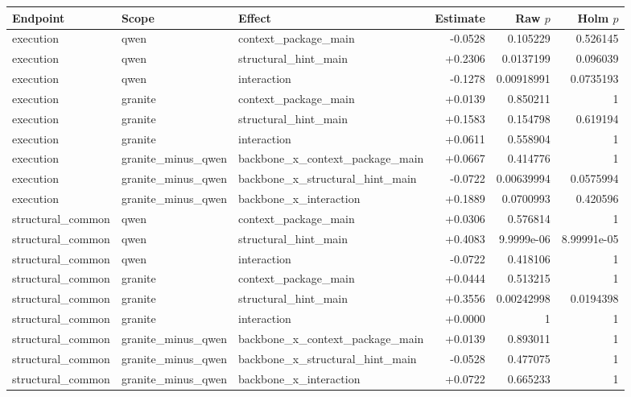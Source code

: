 \begin{tabular}{lllrrr}
\toprule
Endpoint & Scope & Effect & Estimate & Raw $p$ & Holm $p$ \\
\midrule
execution & qwen & context\_package\_main & -0.0528 & 0.105229 & 0.526145 \\
execution & qwen & structural\_hint\_main & +0.2306 & 0.0137199 & 0.096039 \\
execution & qwen & interaction & -0.1278 & 0.00918991 & 0.0735193 \\
execution & granite & context\_package\_main & +0.0139 & 0.850211 & 1 \\
execution & granite & structural\_hint\_main & +0.1583 & 0.154798 & 0.619194 \\
execution & granite & interaction & +0.0611 & 0.558904 & 1 \\
execution & granite\_minus\_qwen & backbone\_x\_context\_package\_main & +0.0667 & 0.414776 & 1 \\
execution & granite\_minus\_qwen & backbone\_x\_structural\_hint\_main & -0.0722 & 0.00639994 & 0.0575994 \\
execution & granite\_minus\_qwen & backbone\_x\_interaction & +0.1889 & 0.0700993 & 0.420596 \\
structural\_common & qwen & context\_package\_main & +0.0306 & 0.576814 & 1 \\
structural\_common & qwen & structural\_hint\_main & +0.4083 & 9.9999e-06 & 8.99991e-05 \\
structural\_common & qwen & interaction & -0.0722 & 0.418106 & 1 \\
structural\_common & granite & context\_package\_main & +0.0444 & 0.513215 & 1 \\
structural\_common & granite & structural\_hint\_main & +0.3556 & 0.00242998 & 0.0194398 \\
structural\_common & granite & interaction & +0.0000 & 1 & 1 \\
structural\_common & granite\_minus\_qwen & backbone\_x\_context\_package\_main & +0.0139 & 0.893011 & 1 \\
structural\_common & granite\_minus\_qwen & backbone\_x\_structural\_hint\_main & -0.0528 & 0.477075 & 1 \\
structural\_common & granite\_minus\_qwen & backbone\_x\_interaction & +0.0722 & 0.665233 & 1 \\
\bottomrule
\end{tabular}
